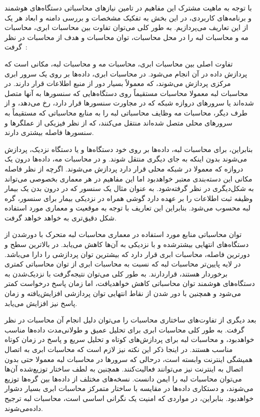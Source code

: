 
با توجه به ماهیت مشترک این مفاهیم در تامین نیازهای محاسباتی دستگاه‌های هوشمند و برنامه‌های کاربردی، در این بخش به تفکیک مشخصات و بررسی دامنه و ابعاد هر یک از این تعاریف می‌پردازیم. به طور کلی می‌توان تفاوت بین محاسبات ابری، محاسبات مه و محاسبات لبه را در محل محاسبات، توان محاسبات و هدف از محاسبات در نظر گرفت~\cite{dolui2017comparison}:


تفاوت اصلی بین محاسبات ابری، محاسبات مه و محاسبات لبه، مکانی است که پردازش داده در آن انجام می‌شود. در محاسبات ابری، داده‌ها بر روی یک سرور ابری مرکزی پردازش می‌شوند، که معمولاً بسیار دور از منبع اطلاعات قرار دارند. در محاسبات لبه معمولا محاسبات مستقیماً روی دستگاه‌هایی که سنسورها به آنها متصل شده‌اند یا سرور‌های دروازه‌ شبکه که در مجاورت سنسورها قرار دارد، رخ می‌دهد، و از طرف دیگر، محاسبات مه وظایف محاسباتی لبه را به منابع محاسباتی که مستقیماً به سرورهای محلی متصل شده‌اند منتقل می‌کنند، که از نظر فیزیکی از عملگرها و سنسورها فاصله بیشتری دارند. 

بنابراین، برای محاسبات لبه، داده‌ها بر روی خود دستگاه‌ها و یا دستگاه نزدیک، پردازش می‌شوند بدون اینکه به جای دیگری منتقل شوند. و در محاسبات مه، داده‌ها درون یک دروازه که معمولا در شبکه محلی قرار دارد پردازش می‌شوند. اگرچه از نظر فاصله مکانی این دسته‌بندی معتبر خواهد‌بود اما این مفاهیم در هر معماری بخصوصی می‌تواند به شکل‌دیگری در نظر گرفته‌شود. به عنوان مثال یک سنسور که در درون بدن یک بیمار وظیفه ثبت اطلاعات را بر عهده دارد گوشی همراه در نزدیکی بیمار برای سنسور، گره لبه محسوب می‌شود. بنابراین این تعاریف با توجه به موقعیت و معماری مورد استفاده شکل دقیق‌تری به خواهد خواهد گرفت.



توان محاسباتی منابع مورد استفاده در معماری محاسبات لبه متحرک با دورشدن از دستگاه‌های انتهایی بیشتر‌شده و با نزدیکی به آن‌ها کاهش می‌یابد. در بالاترین سطح و دورترین فاصله، محاسبات ابری قرار دارد که بیشترین توان پردازشی را دارا می‌باشد. در لایه‌ پایین‌تر محاسبات لبه که نسبت به محاسبات ابری از توان محاسباتی کمتری برخوردار هستند، قراردارند. به طور کلی می‌توان نتیجه‌گرفت با نزدیک‌شدن به دستگاه‌های هوشمند توان محاسباتی کاهش خواهد‌یافت، اما زمان پاسخ درخواست کمتر می‌شود و همچنین با دور شدن از نقاط انتهایی توان پردازشی افزایش‌یافته و زمان پاسخ نیز افزایش می‌یابد.



بعد دیگری از تفاوت‌های ساختاری محاسبات را می‌توان دلیل انجام آن محاسبات در نظر گرفت. به طور کلی محاسبات ابری برای تحلیل عمیق و طولانی‌مدت داده‌ها مناسب خواهد‌بود، و محاسبات لبه برای پردازش‌های کوتاه و تحلیل سریع و پاسخ در زمان کوتاه مناسب هستند. در اینجا ذکر این نکته نیز لازم است که محاسبات ابری به اتصال همیشگی اینترنت وابسته است، درحالی که سرورها در محاسبات لبه معمولا حتی بدون اتصال به اینترنت نیز می‌توانند فعالیت‌کنند. همچنین به لطف ساختار توزیع‌شده آن‌ها می‌توان محاسبات لبه را ایمن دانست. نسخه‌های مختلف از داده‌ها بین گره‌ها توزیع می‌شوند، و دستکاری داده‌ها در مقایسه با ساختار متمرکز محاسبات ابری بسیار دشوار خواهد‌بود. بنابراین، در مواردی که امنیت یک نگرانی اساسی است، محاسبات لبه ترجیح داده‌می‌شوند.

